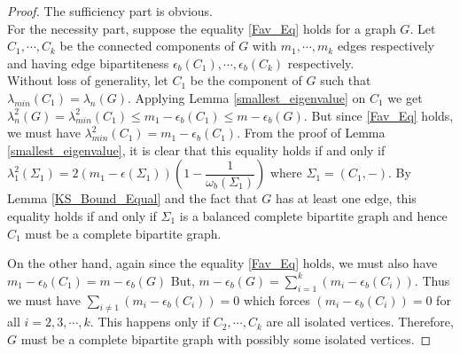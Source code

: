 \documentclass[12pt]{article}
\theoremstyle{plain}
\numberwithin{equation}{section}
\begin{document}
	\begin{proof}
		The sufficiency part is obvious.\\
		For the necessity part, suppose the equality \eqref{Fav_Eq} holds for a graph $G$. Let $C_1,\cdots, C_k$ be the connected components of $G$ with $m_1, \cdots, m_k$ edges respectively and having edge bipartiteness $\epsilon_b(C_1), \cdots,\epsilon_b(C_k)$ respectively.\\
		Without loss of generality, let $C_1$ be the component of $G$ such that $\lambda_{min}(C_1)=\lambda_n(G)$.
		Applying Lemma \ref{smallest_eigenvalue} on $C_1$ we get $ \lambda_n^2(G)=\lambda_{min}^2(C_1)\leq m_1 - \epsilon_b(C_1) \leq m-\epsilon_b(G)$. But since \eqref{Fav_Eq} holds, we must have $\lambda_{min}^2(C_1)=m_1 - \epsilon_b(C_1)$. From the proof of Lemma \ref{smallest_eigenvalue}, it is clear that 
		this equality holds if and only if $\lambda_1^2(\Sigma_1) = 2(m_1-\epsilon(\Sigma_1))\left(1-\dfrac{1}{\omega_b(\Sigma_1)}\right)$ where $\Sigma_1=(C_1,-)$. By Lemma \ref{KS_Bound_Equal} and the fact that $G$ has at least one edge, this equality holds if and only if $\Sigma_1$ is a balanced complete bipartite graph and hence $C_1$ must be a complete bipartite graph.
		
		On the other hand, again since the equality \eqref{Fav_Eq} holds, we must also have $m_1-\epsilon_b(C_1) = m-\epsilon_b(G)$ But, $m-\epsilon_b(G) =\sum \limits_{i=1}^{k} (m_i-\epsilon_b(C_i))$. Thus we must have $\sum \limits_{i\neq 1} (m_i-\epsilon_b(C_i))=0$ which forces $ (m_i-\epsilon_b(C_i))=0$ for all $i=2,3,\cdots, k$. This happens only if $C_2, \cdots, C_k$ are all isolated vertices. Therefore, $G$ must be a complete bipartite graph with possibly some isolated vertices.
	\end{proof}
	
\end{document}
